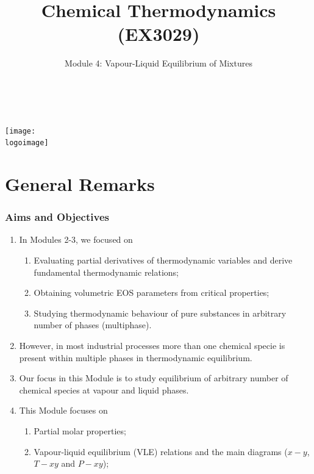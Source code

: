 \documentclass[10pt,compress,handout,ignorenonframetext,unknownkeysallowed]{beamer}
\institute{School of Engineering}
\title{Chemical Thermodynamics (EX3029)}
\subtitle{Module 4: Vapour-Liquid Equilibrium of Mixtures}
\date[ ]{ }
\author[\shortname]{%
  \fullname\\\ttfamily{\emailaddress}
}
\newcommand{\logoimage}{../../FigBanner/UoAHorizBanner}
\begin{document}
\begin{frame}
  \titlepage
  \vfill%
  \begin{center}
    \texttt{[image: \\logoimage]}
  \end{center}
\end{frame}




\section{General Remarks}

\begin{frame}
 \frametitle{Aims and Objectives}
   \begin{enumerate}
     \item<1-> In Modules 2-3, we focused on 
       \begin{enumerate}
         \item<1-> Evaluating partial derivatives of thermodynamic variables and derive fundamental thermodynamic relations;
         \item<1-> Obtaining volumetric EOS parameters from critical properties;
         \item<1-> Studying thermodynamic behaviour of pure substances in arbitrary number of phases (multiphase).
       \end{enumerate} 
     \item<2-> However, in most industrial processes more than one chemical specie is present within multiple phases in thermodynamic equilibrium. 
     \item<3-> Our focus in this Module is to study equilibrium of arbitrary number of chemical species at vapour and liquid phases.
     \item<4-> This Module focuses on 
         \begin{enumerate}
           \item<4-> Partial molar properties; 
           \item<4-> Vapour-liquid equilibrium (VLE) relations and the main diagrams ($x-y$, $T-xy$ and $P-xy$); 
         \end{enumerate}
   \end{enumerate}
\end{frame}
\end{document}
